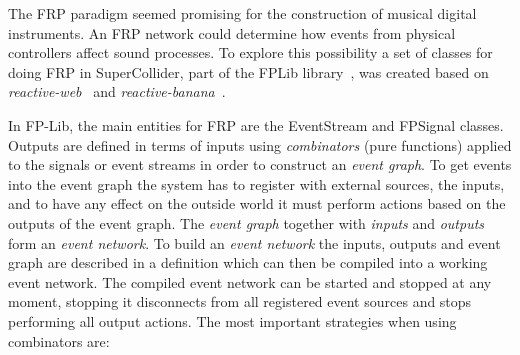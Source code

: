 \documentclass{article}
\begin{document}
The FRP paradigm seemed promising for the construction of musical digital instruments. An FRP network could determine how events from physical controllers affect sound processes. To explore this possibility a set of classes for doing FRP in SuperCollider, part of the FPLib library~\cite{-fpl}, was created based on \emph{reactive-web}~\cite{-reactive-web} and \emph{reactive-banana}~\cite{-reactive-banana}.
 
In FP-Lib, the main entities for FRP are the EventStream and FPSignal classes.  Outputs are defined in terms of inputs using \emph{combinators} (pure functions) applied to the signals or event streams in order to construct an \emph{event graph}. To get events into the event graph the system has to register with external sources, the inputs, and to have any effect on the outside world it must perform actions based on the outputs of the event graph. The \emph{event graph} together with \emph{inputs} and \emph{outputs} form an \emph{event network}. To build an \emph{event network} the inputs, outputs and event graph are described in a definition which can then be compiled into a working event network. The compiled event network can be started and stopped at any moment, stopping it disconnects from all registered event sources and stops performing all output actions. The most important strategies when using combinators are:
\end{document}
